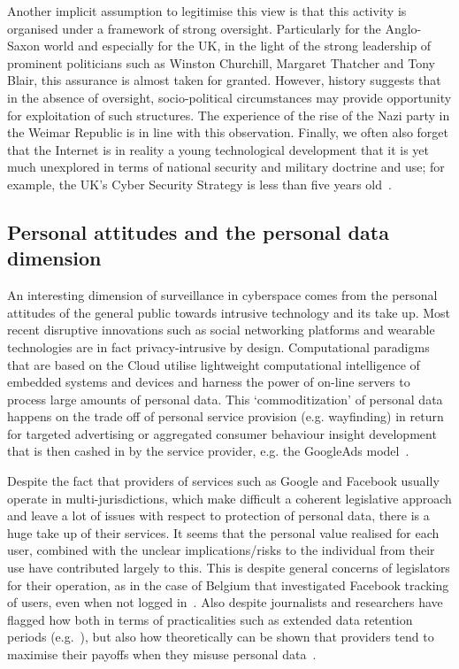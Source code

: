 \documentclass{llncs}
\begin{document}
Another implicit assumption to legitimise this view is that this activity is organised under a framework of strong oversight. Particularly for the Anglo-Saxon world and especially for the UK, in the light of the strong leadership of prominent politicians such as Winston Churchill, Margaret Thatcher and Tony Blair, this assurance is almost taken for granted. However, history suggests that in the absence of oversight, socio-political circumstances may provide opportunity for exploitation of such structures. The experience of the rise of the Nazi party in the Weimar Republic is in line with this observation. Finally, we often also forget that the Internet is in reality a young technological development that it is yet much unexplored in terms of national security and military doctrine and use; for example, the UK's Cyber Security Strategy is less than five years old~\cite{ukcss:2011}.

\subsection{Personal attitudes and the personal data dimension}
An interesting dimension of surveillance in cyberspace comes from the personal attitudes of the general public towards intrusive technology and its take up. Most recent disruptive innovations such as social networking platforms and wearable technologies are in fact privacy-intrusive by design. Computational paradigms that are based on the Cloud utilise lightweight computational intelligence of embedded systems and devices and harness the power of on-line servers to process large amounts of personal data. This `commoditization' of personal data happens on the trade off of personal service provision (e.g. wayfinding) in return for targeted advertising or aggregated consumer behaviour insight development that is then cashed in by the service provider, e.g. the GoogleAds model~\cite{GoogleAds}.

Despite the fact that providers of services such as Google and Facebook usually operate in multi-jurisdictions, which make difficult a coherent legislative approach and leave a lot of issues with respect to protection of personal data, there is a huge take up of their services. It seems that the personal value realised for each user, combined with the unclear implications/risks to the individual from their use have contributed largely to this. This is despite general concerns of legislators for their operation, as in the case of Belgium that investigated Facebook tracking of users, even when not logged in~\cite{facebookBel}. Also despite journalists and researchers have flagged how both in terms of practicalities such as extended data retention periods (e.g.~\cite{Wired}), but also how theoretically can be shown that providers tend to maximise their payoffs when they misuse personal data~\cite{Anastasopoulou}.
\end{document}
